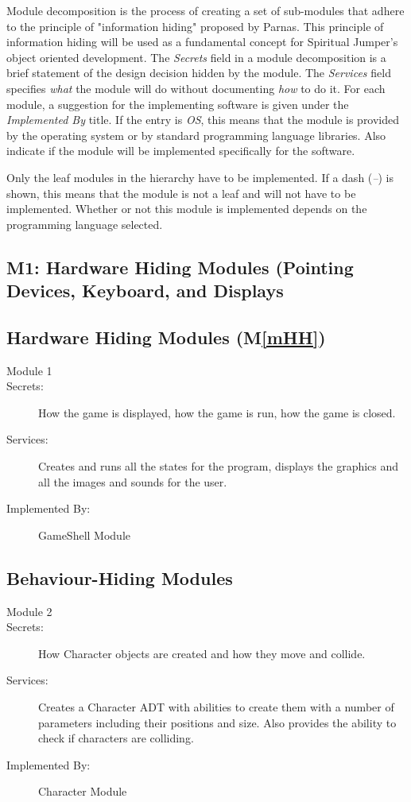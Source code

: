\documentclass[12pt, titlepage]{article}
\newcommand{\mref}[1]{M\ref{#1}}
\begin{document}
Module decomposition is the process of creating a set of sub-modules that adhere to the principle of  "information hiding" proposed by Parnas. This principle of information hiding will be used as a fundamental concept for Spiritual Jumper's object oriented development.
The \emph{Secrets} field in a module
decomposition is a brief statement of the design decision hidden by the
module. The \emph{Services} field specifies \emph{what} the module will do
without documenting \emph{how} to do it. For each module, a suggestion for the
implementing software is given under the \emph{Implemented By} title. If the
entry is \emph{OS}, this means that the module is provided by the operating
system or by standard programming language libraries.  Also indicate if the
module will be implemented specifically for the software.

Only the leaf modules in the
hierarchy have to be implemented. If a dash (\emph{--}) is shown, this means
that the module is not a leaf and will not have to be implemented. Whether or
not this module is implemented depends on the programming language
selected.


\subsection{M1: Hardware Hiding Modules (Pointing Devices, Keyboard, and Displays}

\subsection{Hardware Hiding Modules (\mref{mHH})}

\begin{description}


\item[Module 1]
\item[Secrets:]How the game is displayed, how the game is run, how the game is closed.
\item[Services:]Creates and runs all the states for the program, displays the graphics and all the images and sounds for the user.
\item[Implemented By:] GameShell Module
\end{description}

\subsection{Behaviour-Hiding Modules}

\begin{description}
\item[Module 2]
\item[Secrets:]How Character objects are created and how they move and collide.
\item[Services:]Creates a Character ADT with abilities to create them with a number of parameters including their positions and size. Also provides the ability to check if characters are colliding.
\item[Implemented By:] Character Module
\end{description}
\end{document}
